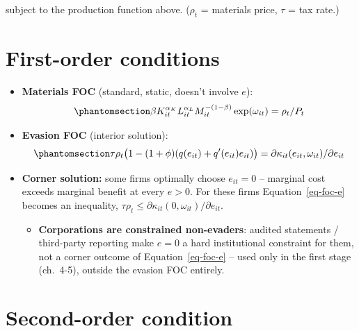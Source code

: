 \documentclass[
  12pt,
  letterpaper,
  oneside,
  openany]{report}
\providecommand{\tightlist}{%
  \setlength{\itemsep}{0pt}\setlength{\parskip}{0pt}}
\begin{document}
subject to the production function above. (\(\rho_t\) = materials price,
\(\tau\) = tax rate.)

\section{First-order conditions}\label{first-order-conditions}

\begin{itemize}
\tightlist
\item
  \textbf{Materials FOC} (standard, static, doesn't involve \(e\)):
  \begin{equation}\protect\phantomsection\label{eq-foc-m}{
  \beta K_{it}^{\alpha_K}L_{it}^{\alpha_L}M_{it}^{-(1-\beta)}\exp(\omega_{it})=\rho_t/P_t
  }\end{equation}
\item
  \textbf{Evasion FOC} (interior solution):
  \begin{equation}\protect\phantomsection\label{eq-foc-e}{
  \tau\rho_t\big(1-(1+\phi)(q(e_{it})+q'(e_{it})e_{it})\big)=\partial\kappa_{it}(e_{it},\omega_{it})/\partial e_{it}
  }\end{equation}
\item
  \textbf{Corner solution:} some firms optimally choose \(e_{it}=0\) --
  marginal cost exceeds marginal benefit at every \(e>0\). For these
  firms Equation~\ref{eq-foc-e} becomes an inequality,
  \(\tau\rho_t\le\partial\kappa_{it}(0,\omega_{it})/\partial e_{it}\).

  \begin{itemize}
  \tightlist
  \item
    \textbf{Corporations are constrained non-evaders}: audited
    statements / third-party reporting make \(e=0\) a hard institutional
    constraint for them, not a corner outcome of Equation~\ref{eq-foc-e}
    -- used only in the first stage (ch.~4-5), outside the evasion FOC
    entirely.
  \end{itemize}
\end{itemize}

\section{Second-order condition}\label{second-order-condition}
\end{document}
